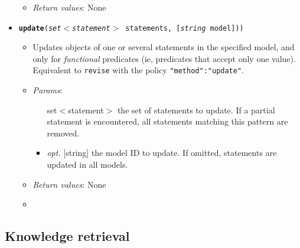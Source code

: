 \begin{itemize}
\begin{itemize}
\item  \emph{Return values}: None
\end{itemize}

\item  \texttt{\textbf{update}(\emph{set$<$statement$>$} statements, [\emph{string} model]))}
\begin{itemize}
\item  Updates objects of one or several statements in the specified model, and only for \emph{functional} predicates (ie, predicates that accept only one value). Equivalent to \texttt{revise} with the policy \texttt{{"method":"update"}}.
\item  \emph{Params}:
\begin{itemize}
\item  [set$<$statement$>$] the set of statements to update. If a partial statement is encountered, all statements matching this pattern are removed.
\item  \emph{opt.} [string] the model ID to update. If omitted, statements are updated in all models. 
\end{itemize}

\item  \emph{Return values}: None
\item  
\end{itemize}

\end{itemize}

\subsection{Knowledge retrieval}


